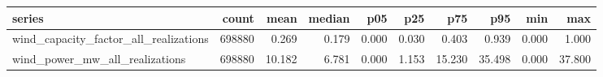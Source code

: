 \begin{tabular}{lrrrrrrrrr}
\toprule
series & count & mean & median & p05 & p25 & p75 & p95 & min & max \\
\midrule
wind_capacity_factor_all_realizations & 698880 & 0.269 & 0.179 & 0.000 & 0.030 & 0.403 & 0.939 & 0.000 & 1.000 \\
wind_power_mw_all_realizations & 698880 & 10.182 & 6.781 & 0.000 & 1.153 & 15.230 & 35.498 & 0.000 & 37.800 \\
\bottomrule
\end{tabular}
